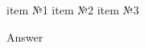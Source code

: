 

\begin{minipage}{0.45\textwidth}
    \begin{itemize}[<+->]
        \iitem item №1
        \iitem item №2 
        \iitem item №3
    \end{itemize}
\end{minipage}
\hfill
\begin{minipage}{0.45\textwidth}
    Answer
\end{minipage}
